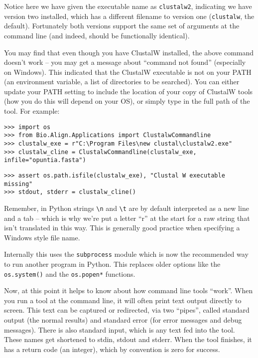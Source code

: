 Notice here we have given the executable name as \texttt{clustalw2},
indicating we have version two installed, which has a different filename to
version one (\texttt{clustalw}, the default). Fortunately both versions
support the same set of arguments at the command line (and indeed, should be
functionally identical).

You may find that even though you have ClustalW installed, the above command
doesn't work -- you may get a message about ``command not found'' (especially
on Windows). This indicated that the ClustalW executable is not on your PATH
(an environment variable, a list of directories to be searched). You can
either update your PATH setting to include the location of your copy of
ClustalW tools (how you do this will depend on your OS), or simply type in
the full path of the tool. For example:

\begin{verbatim}
>>> import os
>>> from Bio.Align.Applications import ClustalwCommandline
>>> clustalw_exe = r"C:\Program Files\new clustal\clustalw2.exe"
>>> clustalw_cline = ClustalwCommandline(clustalw_exe, infile="opuntia.fasta")
\end{verbatim}
\begin{verbatim}
>>> assert os.path.isfile(clustalw_exe), "Clustal W executable missing"
>>> stdout, stderr = clustalw_cline()
\end{verbatim}

\noindent Remember, in Python strings \verb|\n| and \verb|\t| are by default
interpreted as a new line and a tab -- which is why we're put a letter
``r'' at the start for a raw string that isn't translated in this way.
This is generally good practice when specifying a Windows style file name.

Internally this uses the
\verb|subprocess| module which is now the recommended way to run another
program in Python. This replaces older options like the \verb|os.system()|
and the \verb|os.popen*| functions.

Now, at this point it helps to know about how command line tools ``work''.
When you run a tool at the command line, it will often print text output
directly to screen. This text can be captured or redirected, via
two ``pipes'', called standard output (the normal results) and standard
error (for error messages and debug messages). There is also standard
input, which is any text fed into the tool. These names get shortened
to stdin, stdout and stderr. When the tool finishes, it has a return
code (an integer), which by convention is zero for success.

